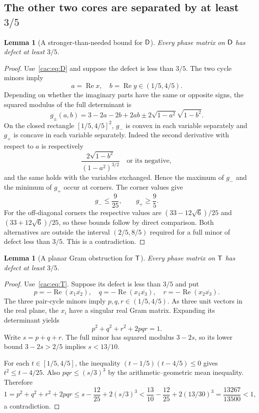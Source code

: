 \documentclass[11pt]{article}
\numberwithin{equation}{section}
\newtheorem{lemma}[theorem]{Lemma}
\theoremstyle{definition}
\begin{document}
\subsection{The other two cores are separated by at least \texorpdfstring{$3/5$}{3/5}}

\begin{lemma}[A stronger-than-needed bound for $\mathsf D$]
\label{cac:lem:Dgap}
Every phase matrix on $\mathsf D$ has defect at least $3/5$.
\end{lemma}
\begin{proof}
Use~\eqref{cac:eq:D} and suppose the defect is less than $3/5$. The two cycle minors imply
\[
 a=\operatorname{Re}x,\quad b=\operatorname{Re}y\in(1/5,4/5).
\]
Depending on whether the imaginary parts have the same or opposite signs, the squared modulus of the full determinant is
\[
 g_\pm(a,b)=3-2a-2b+2ab
              \pm2\sqrt{1-a^2}\sqrt{1-b^2}.
\]
On the closed rectangle $[1/5,4/5]^2$, $g_-$ is convex in each variable separately and $g_+$ is concave in each variable separately. Indeed the second derivative with respect to $a$ is respectively
\[
 \frac{2\sqrt{1-b^2}}{(1-a^2)^{3/2}}
 \quad\text{or its negative},
\]
and the same holds with the variables exchanged. Hence the maximum of $g_-$ and the minimum of $g_+$ occur at corners. The corner values give
\[
 g_-\le\frac9{25},\qquad g_+\ge\frac95.
\]
For the off-diagonal corners the respective values are $(33-12\sqrt6)/25$ and $(33+12\sqrt6)/25$, so these bounds follow by direct comparison. Both alternatives are outside the interval $(2/5,8/5)$ required for a full minor of defect less than $3/5$. This is a contradiction.
\end{proof}

\begin{lemma}[A planar Gram obstruction for $\mathsf T$]
\label{cac:lem:Tgap}
Every phase matrix on $\mathsf T$ has defect at least $3/5$.
\end{lemma}
\begin{proof}
Use~\eqref{cac:eq:T}. Suppose its defect is less than $3/5$ and put
\[
 p=-\operatorname{Re}(x_1\overline{x_2}),\quad
 q=-\operatorname{Re}(x_1\overline{x_3}),\quad
 r=-\operatorname{Re}(x_2\overline{x_3}).
\]
The three pair-cycle minors imply $p,q,r\in(1/5,4/5)$. As three unit vectors in the real plane, the $x_i$ have a singular real Gram matrix. Expanding its determinant yields
\begin{equation}
 p^2+q^2+r^2+2pqr=1.
 \label{cac:eq:Gram}
\end{equation}
Write $s=p+q+r$. The full minor has squared modulus $3-2s$, so its lower bound $3-2s>2/5$ implies $s<13/10$.

For each $t\in[1/5,4/5]$, the inequality $(t-1/5)(t-4/5)\le0$ gives $t^2\le t-4/25$. Also $pqr\le(s/3)^3$ by the arithmetic--geometric mean inequality. Therefore
\[
 1=p^2+q^2+r^2+2pqr
 \le s-\frac{12}{25}+2(s/3)^3
 <\frac{13}{10}-\frac{12}{25}+2(13/30)^3
 =\frac{13267}{13500}<1,
\]
a contradiction.
\end{proof}
\end{document}
